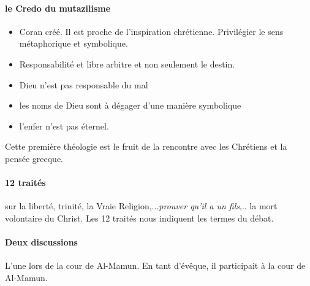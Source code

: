 \paragraph{le Credo du mutazilisme}
\begin{itemize}
    \item Coran créé. Il est proche de l'inspiration chrétienne. Privilégier le sens métaphorique et symbolique. 
    \item Responsabilité et libre arbitre et non seulement le destin. 
    \item Dieu n'est pas responsable du mal
    \item les noms de Dieu sont à dégager d'une manière symbolique
    \item l'enfer n'est pas éternel. 
\end{itemize}
Cette première théologie  est le fruit de la rencontre avec les Chrétiens et la pensée grecque.  


\paragraph{12 traités } sur la liberté, trinité, la Vraie Religion,...\textit{prouver qu'il a un fils},.. la mort volontaire du Christ. Les 12 traités nous indiquent les termes du débat.  

\paragraph{Deux discussions} L'une lors de la cour de Al-Mamun. En tant d'évêque, il participait à la cour de Al-Mamun. 


